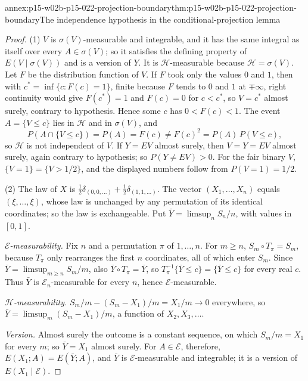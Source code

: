\begin{annexitem}{annex:p15-w02b-p15-022-projection-boundary}{thm:p15-w02b-p15-022-projection-boundary}{The independence hypothesis in the conditional-projection lemma}
\begin{proof}
(1) \(V\) is \(\sigma(V)\)-measurable and integrable, and it has the same
integral as itself over every \(A\in\sigma(V)\); so it satisfies the defining
property of \(E(V\mid\sigma(V))\) and is a version of \(Y\). It is
\(\mathcal H\)-measurable because \(\mathcal H=\sigma(V)\). Let \(F\) be the
distribution function of \(V\). If \(F\) took only the values \(0\) and
\(1\), then with \(c^*=\inf\{c:F(c)=1\}\), finite because \(F\) tends to
\(0\) and \(1\) at \(\mp\infty\), right continuity would give
\(F(c^*)=1\) and \(F(c)=0\) for \(c<c^*\), so \(V=c^*\) almost surely,
contrary to hypothesis. Hence some \(c\) has \(0<F(c)<1\). The event
\(A=\{V\leq c\}\) lies in \(\mathcal H\) and in \(\sigma(V)\), and
\[
 P(A\cap\{V\leq c\})=P(A)=F(c)\neq F(c)^2=P(A)\,P(V\leq c),
\]
so \(\mathcal H\) is not independent of \(V\). If \(Y=EV\) almost surely,
then \(V=Y=EV\) almost surely, again contrary to hypothesis; so
\(P(Y\neq EV)>0\). For the fair binary \(V\), \(\{V=1\}=\{V>1/2\}\), and
the displayed numbers follow from \(P(V=1)=1/2\).

(2) The law of \(X\) is \(\tfrac12\delta_{(0,0,\ldots)}+\tfrac12\delta_{(1,1,\ldots)}\).
The vector \((X_1,\ldots,X_n)\) equals \((\xi,\ldots,\xi)\), whose law is
unchanged by any permutation of its identical coordinates; so the law is
exchangeable. Put \(\bar Y=\limsup_nS_n/n\), with values in \([0,1]\).

\emph{\(\mathcal E\)-measurability.} Fix \(n\) and a permutation \(\pi\) of
\(1,\ldots,n\). For \(m\geq n\), \(S_m\circ T_\pi=S_m\), because \(T_\pi\)
only rearranges the first \(n\) coordinates, all of which enter \(S_m\).
Since \(\bar Y=\limsup_{m\geq n}S_m/m\), also \(\bar Y\circ T_\pi=\bar Y\),
so \(T_\pi^{-1}\{\bar Y\leq c\}=\{\bar Y\leq c\}\) for every real \(c\). Thus
\(\bar Y\) is \(\mathcal E_n\)-measurable for every \(n\), hence
\(\mathcal E\)-measurable.

\emph{\(\mathcal H\)-measurability.} \(S_m/m-(S_m-X_1)/m=X_1/m\to0\)
everywhere, so \(\bar Y=\limsup_m(S_m-X_1)/m\), a function of
\(X_2,X_3,\ldots\).

\emph{Version.} Almost surely the outcome is a constant sequence, on which
\(S_m/m=X_1\) for every \(m\); so \(\bar Y=X_1\) almost surely. For
\(A\in\mathcal E\), therefore, \(E(X_1;A)=E(\bar Y;A)\), and \(\bar Y\) is
\(\mathcal E\)-measurable and integrable; it is a version of
\(E(X_1\mid\mathcal E)\).


\end{proof}
\end{annexitem}
